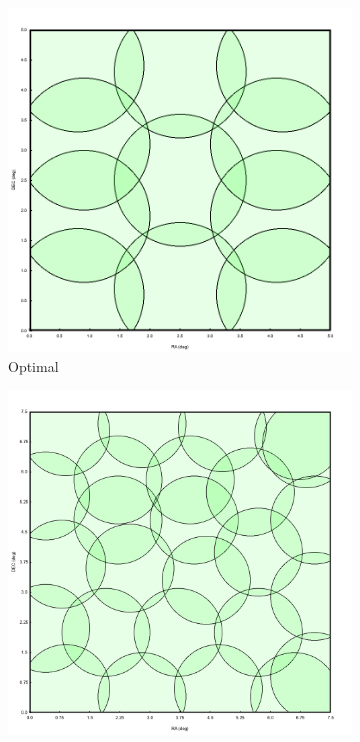 \documentclass{article}
\begin{document}
\begin{multicols*}{2}
\begin{figure}
    \centering
    \begin{subfigure}{0.45\textwidth}
        \centering
        \includegraphics[width=\linewidth]{images/uniform.png}
        \caption{Optimal}
        \label{fig:empty_field1}
    \end{subfigure}
    \begin{subfigure}{0.45\textwidth}
        \centering
        \includegraphics[width=\linewidth]{images/empty_field_suboptimal.PNG}

\end{subfigure}
\end{figure}
\end{multicols*}
\end{document}
